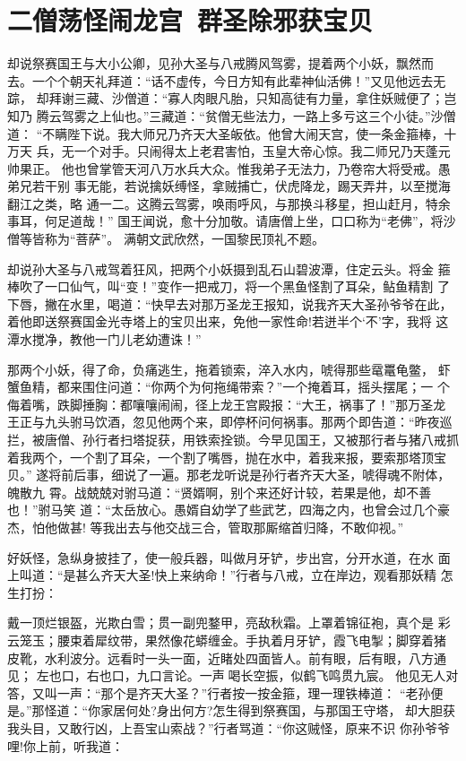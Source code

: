 \chapter{二僧荡怪闹龙宫~群圣除邪获宝贝}

却说祭赛国王与大小公卿，见孙大圣与八戒腾风驾雾，提着两个小妖，飘然而
去。一个个朝天礼拜道：“话不虚传，今日方知有此辈神仙活佛！”又见他远去无踪，
却拜谢三藏、沙僧道：“寡人肉眼凡胎，只知高徒有力量，拿住妖贼便了；岂知乃
腾云驾雾之上仙也。”三藏道：“贫僧无些法力，一路上多亏这三个小徒。”沙僧道：
“不瞒陛下说。我大师兄乃齐天大圣皈依。他曾大闹天宫，使一条金箍棒，十万天
兵，无一个对手。只闹得太上老君害怕，玉皇大帝心惊。我二师兄乃天蓬元帅果正。
他也曾掌管天河八万水兵大众。惟我弟子无法力，乃卷帘大将受戒。愚弟兄若干别
事无能，若说擒妖缚怪，拿贼捕亡，伏虎降龙，踢天弄井，以至搅海翻江之类，略
通一二。这腾云驾雾，唤雨呼风，与那换斗移星，担山赶月，特余事耳，何足道哉！”
国王闻说，愈十分加敬。请唐僧上坐，口口称为“老佛”，将沙僧等皆称为“菩萨”。
满朝文武欣然，一国黎民顶礼不题。

却说孙大圣与八戒驾着狂风，把两个小妖摄到乱石山碧波潭，住定云头。将金
箍棒吹了一口仙气，叫“变！”变作一把戒刀，将一个黑鱼怪割了耳朵，鲇鱼精割
了下唇，撇在水里，喝道：“快早去对那万圣龙王报知，说我齐天大圣孙爷爷在此，
着他即送祭赛国金光寺塔上的宝贝出来，免他一家性命!若迸半个‘不’字，我将
这潭水搅净，教他一门儿老幼遭诛！”

那两个小妖，得了命，负痛逃生，拖着锁索，淬入水内，唬得那些鼋鼍龟鳖，
虾蟹鱼精，都来围住问道：“你两个为何拖绳带索？”一个掩着耳，摇头摆尾；一
个侮着嘴，跌脚捶胸：都嚷嚷闹闹，径上龙王宫殿报：“大王，祸事了！”那万圣龙
王正与九头驸马饮酒，忽见他两个来，即停杯问何祸事。那两个即告道：“昨夜巡
拦，被唐僧、孙行者扫塔捉获，用铁索拴锁。今早见国王，又被那行者与猪八戒抓
着我两个，一个割了耳朵，一个割了嘴唇，抛在水中，着我来报，要索那塔顶宝贝。”
遂将前后事，细说了一遍。那老龙听说是孙行者齐天大圣，唬得魂不附体，魄散九
霄。战兢兢对驸马道：“贤婿啊，别个来还好计较，若果是他，却不善也！”驸马笑
道：“太岳放心。愚婿自幼学了些武艺，四海之内，也曾会过几个豪杰，怕他做甚!
等我出去与他交战三合，管取那厮缩首归降，不敢仰视。”

好妖怪，急纵身披挂了，使一般兵器，叫做月牙铲，步出宫，分开水道，在水
面上叫道：“是甚么齐天大圣!快上来纳命！”行者与八戒，立在岸边，观看那妖精
怎生打扮：

戴一顶烂银盔，光欺白雪；贯一副兜鍪甲，亮敌秋霜。上罩着锦征袍，真个是
彩云笼玉；腰束着犀纹带，果然像花蟒缠金。手执着月牙铲，霞飞电掣；脚穿着猪
皮靴，水利波分。远看时一头一面，近睹处四面皆人。前有眼，后有眼，八方通见；
左也口，右也口，九口言论。一声喝长空振，似鹤飞鸣贯九宸。
他见无人对答，又叫一声：“那个是齐天大圣？”行者按一按金箍，理一理铁棒道：
“老孙便是。”那怪道：“你家居何处?身出何方?怎生得到祭赛国，与那国王守塔，
却大胆获我头目，又敢行凶，上吾宝山索战？”行者骂道：“你这贼怪，原来不识
你孙爷爷哩!你上前，听我道：

